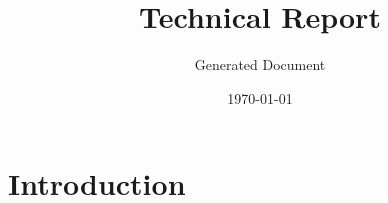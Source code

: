 \documentclass[12pt]{report}
\title{Technical Report}
\author{Generated Document}
\date{\today}
\begin{document}
\maketitle
\tableofcontents
\newpage

\chapter{Introduction}

\end{document}
